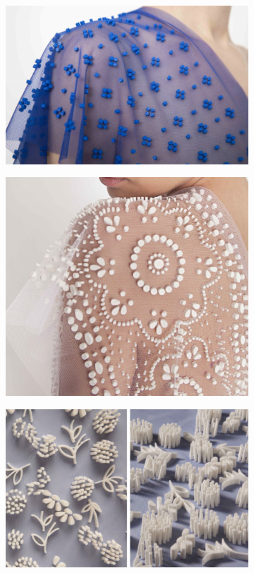 \documentclass[fontsize=12pt, appendixprefix=true]{scrreprt}
\begin{document}
\begin{figure}[h!]
	\centering
	\begin{subfigure}[b]{0.3\linewidth}
	  \includegraphics[width=\linewidth]{img/tr_01.png}
	  \caption{}
	\end{subfigure}
	\begin{subfigure}[b]{0.3\linewidth}
	  \includegraphics[width=\linewidth]{img/tr_02.png}
	  \caption{}
	\end{subfigure}
	\begin{subfigure}[b]{0.3\linewidth}
		\includegraphics[width=\linewidth]{img/tr_03.png}

\end{subfigure}
\end{figure}
\end{document}
